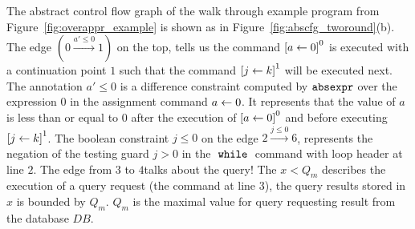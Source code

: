  
The abstract control flow graph of the walk through example program from 
Figure~\ref{fig:overappr_example} is shown as in
Figure~\ref{fig:abscfg_tworound}(b).
The edge $(0 \xrightarrow{a' \leq 0} 1)$ on the top, tells us the command 
$\clabel{\assign{a}{0}}^0$ is executed with a continuation point $1$ such that the
command $\clabel{\assign{j}{k}}^1$ will be executed next.
The annotation $a' \leq 0$ is a difference constraint 
computed by $\mathtt{abs}{\mathtt{expr}}$ over
the expression $0$ in the assignment command $\mathrel{ a \leftarrow 0 }$.
It represents that the value of $a$ is less than or equal to $0$ after the
execution of $\clabel{\assign{a}{0}}^0$ and before executing $\clabel{\assign{j}{k}}^1$.
The boolean constraint $j \leq 0 $ on the edge $2 \xrightarrow{j \leq 0} 6$, 
represents the negation of the testing guard $j > 0$
in the $\;\mathtt{while}\;$ command with loop header at line $2$.
The edge from $3$ to $4$talks about the query! The $x < Q_m$ describes the execution of a query request (the command at line 3), the query results stored in $x$ is bounded by $Q_m$. 
$Q_m$ is the maximal value for query requesting result from the database $DB$. 
